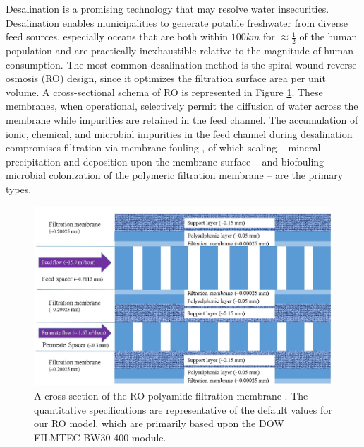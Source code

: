 Desalination is a promising technology that may resolve water insecurities. Desalination enables municipalities to generate potable freshwater from diverse feed sources, especially oceans \cite{2018DepartmentWater,Service2006DesalinationUp} that are both within $100 km$ for $\approx \frac{1}{2}$ of the human population \cite{Amy2017Membrane-basedProspects} and are practically inexhaustible relative to the magnitude of human consumption. The most common desalination method is the spiral-wound reverse osmosis (RO) design, since it optimizes the filtration surface area  per unit volume. A cross-sectional schema of RO is represented in Figure \ref{membrane_schema}. These membranes, when operational, selectively permit the diffusion of water across the membrane while impurities are retained in the feed channel. The accumulation of ionic, chemical, and microbial impurities in the feed channel during desalination compromises filtration via membrane fouling \cite{Goosen2004FoulingReview}, of which scaling -- mineral precipitation and deposition upon the membrane surface \cite{Warsinger2015ScalingReview,Khan2013SourceSea,Tang2014FoulingPlant,Shmulevsky2017AnalysisMembranes} -- and biofouling \cite{Characklis1983BiofilmsFouling,Flemming1997ReverseBiofouling,Ridgway1991BiofoulingMembranes,Ivnitsky2005CharacterizationTreatment,Herzberg2007BiofoulingPressure,Schneider2005DynamicsBiofouling,Flemming1997BiofoulingProcesses,Cantor1969BiologicalMembranes,Murphy2001MicrobiologicalMembranes,Chen2004CommunityApproach} -- microbial colonization of the polymeric filtration membrane \cite{Garcia-Trinanes2021InvestigatingDevice,Suwarno2014BiofoulingDevelopment} -- are the primary types.  

\begin{figure}
    \centering
    \includegraphics[width = \textwidth]{images/Introduction/membrane_schema.jpg}
    \caption{
        A cross-section of the RO polyamide filtration membrane \cite{Strubbe2018CalibrationFull-Scale}. The quantitative specifications are representative of the default values for our RO model, which are primarily based upon the DOW FILMTEC BW30-400 module.
    }
    \label{membrane_schema}
\end{figure}

